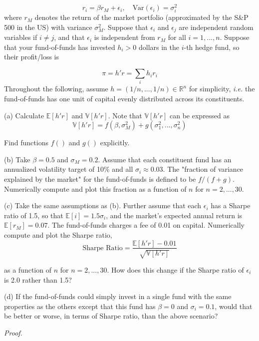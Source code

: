 \documentclass[a4paper]{article}
\begin{document}
\[r_i=\beta r_M+\epsilon_i,\quad \text{Var}(\epsilon_i)=\sigma_i^2\]
where $r_M$ denotes the return of the market portfolio (approximated by the S\&P 500 in the US) with variance $\sigma_M^2$. Suppose that $\epsilon_i$ and $\epsilon_j$ are independent random variables if $i\neq j$, and that $\epsilon_i$ is independent from $r_M$ for all $i=1,...,n$. Suppose that your fund-of-funds has invested $h_i>0$ dollars in the $i$-th hedge fund, so their profit/loss is

\[\pi=h'r=\sum_i{h_i r_i}\]
Throughout the following, assume $h=(1/n,...,1/n)\in\mathbb{R}^n$ for simplicity, \textit{i.e.} the fund-of-funds has one unit of capital evenly distributed across its constituents.\newline

(a) Calculate $\mathbb{E}[h'r]$ and $\mathbb{V}[h'r]$. Note that $\mathbb{V}[h'r]$ can be expressed as
\[\mathbb{V}[h'r]=f(\beta,\sigma_M^2)+g(\sigma_1^2,...,\sigma_n^2)\]

Find functions $f()$ and $g()$ explicitly.\newline

(b) Take $\beta=0.5$ and $\sigma_M=0.2$. Assume that each constituent fund has an annualized volatility target of 10\% and all $\sigma_i\approx 0.03$. The "fraction of variance explained by the market" for the fund-of-funds is defined to be $f/(f+g)$. Numerically compute and plot this fraction as a function of $n$ for $n=2,...,30$.\newline

(c) Take the same assumptions as (b). Further assume that each $\epsilon_i$ has a Sharpe ratio of 1.5, so that $\mathbb{E}[i]=1.5\sigma_i$, and the market's expected annual return is $\mathbb{E}[r_M]=0.07$. The fund-of-funds charges a fee of 0.01 on capital. Numerically compute and plot the Sharpe ratio, 
\[\text{Sharpe Ratio}=\frac{\mathbb{E}[h'r]-0.01}{\sqrt{\mathbb{V}[h'r]}}\]

as a function of $n$ for $n=2,...,30$. How does this change if the Sharpe ratio of $\epsilon_i$ is 2.0 rather than 1.5?\newline

(d) If the fund-of-funds could simply invest in a single fund with the same properties as the others except that this fund has $\beta=0$ and $\sigma_i=0.1$, would that be better or worse, in terms of Sharpe ratio, than the above scenario?\newline


\textit{Proof.}\newline
\end{document}

